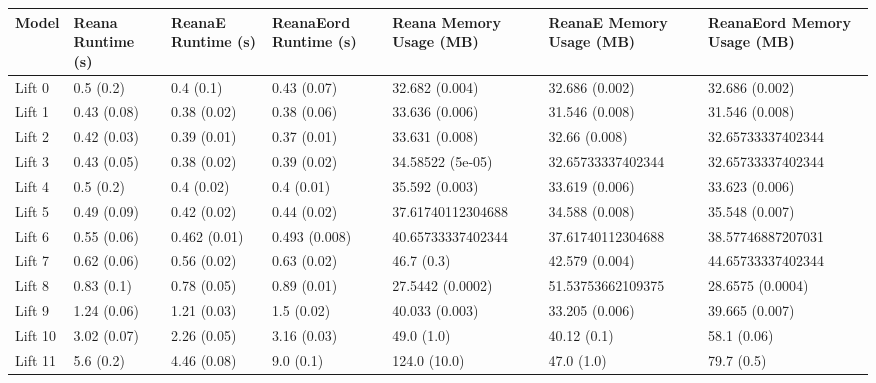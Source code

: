 \begin{tabular}{lllllll}
\toprule
  Model & Reana Runtime (s) & ReanaE Runtime (s) & ReanaEord Runtime (s) & Reana Memory Usage (MB) & ReanaE Memory Usage (MB) & ReanaEord Memory Usage (MB) \\
\midrule
 Lift 0 &         0.5 (0.2) &          0.4 (0.1) &           0.43 (0.07) &          32.682 (0.004) &           32.686 (0.002) &              32.686 (0.002) \\
 Lift 1 &       0.43 (0.08) &        0.38 (0.02) &           0.38 (0.06) &          33.636 (0.006) &           31.546 (0.008) &              31.546 (0.008) \\
 Lift 2 &       0.42 (0.03) &        0.39 (0.01) &           0.37 (0.01) &          33.631 (0.008) &            32.66 (0.008) &           32.65733337402344 \\
 Lift 3 &       0.43 (0.05) &        0.38 (0.02) &           0.39 (0.02) &        34.58522 (5e-05) &        32.65733337402344 &           32.65733337402344 \\
 Lift 4 &         0.5 (0.2) &         0.4 (0.02) &            0.4 (0.01) &          35.592 (0.003) &           33.619 (0.006) &              33.623 (0.006) \\
 Lift 5 &       0.49 (0.09) &        0.42 (0.02) &           0.44 (0.02) &       37.61740112304688 &           34.588 (0.008) &              35.548 (0.007) \\
 Lift 6 &       0.55 (0.06) &       0.462 (0.01) &         0.493 (0.008) &       40.65733337402344 &        37.61740112304688 &           38.57746887207031 \\
 Lift 7 &       0.62 (0.06) &        0.56 (0.02) &           0.63 (0.02) &              46.7 (0.3) &           42.579 (0.004) &           44.65733337402344 \\
 Lift 8 &        0.83 (0.1) &        0.78 (0.05) &           0.89 (0.01) &        27.5442 (0.0002) &        51.53753662109375 &            28.6575 (0.0004) \\
 Lift 9 &       1.24 (0.06) &        1.21 (0.03) &            1.5 (0.02) &          40.033 (0.003) &           33.205 (0.006) &              39.665 (0.007) \\
Lift 10 &       3.02 (0.07) &        2.26 (0.05) &           3.16 (0.03) &              49.0 (1.0) &              40.12 (0.1) &                 58.1 (0.06) \\
Lift 11 &         5.6 (0.2) &        4.46 (0.08) &             9.0 (0.1) &            124.0 (10.0) &               47.0 (1.0) &                  79.7 (0.5) \\

\end{tabular}
